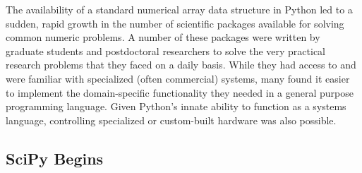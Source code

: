 \documentclass[fleqn,10pt]{wlscirep}
\begin{document}
The availability of a standard numerical array data structure in
Python led to a sudden, rapid growth in the number of scientific
packages available for solving common numeric problems.
A number of these packages were written by graduate students and
postdoctoral researchers to solve the very practical research problems
that they faced on a daily basis.  While they had access to and were
familiar with specialized (often commercial) systems, many found
it easier to implement the domain-specific functionality they needed
in a general purpose programming language.  Given Python's innate
ability to function as a systems language, controlling specialized or
custom-built hardware was also possible.


%




\subsection*{SciPy Begins}
\end{document}

